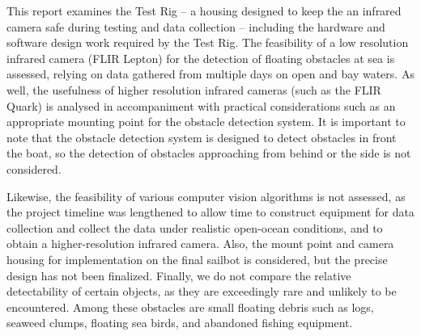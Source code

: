
\iffalse
From the guideline:
This is where the subject of the report can be specified fully; indicate not only what you are examining, but also when and where, as appropriate. As well as knowing what to expect in your report, your reader needs to know what not to expect. Indicate the kinds of problems, places, times, and personnel that are not considered and the impact these omissions and constraints may have on your results. You may also want to explain why these limitations have been necessary.

Notes:
what does the report consider?
-test rig, design and development
-testing IR camera feasibility on two days
-developing a control system for the test rig, allowing for video capture
-the team might be able to get a better camera
-long cables seem to be fine

what didn't we do?
-we don't evaluate which algorithms are best
--we spent a lot of time getting ready to gather data (getting test rigs built and working)
--lots of time on video processing systems to get good contrast
-the lepton cannot see small objects such as logs
-we don't provide a final housing
--sailbot might use our lepton holder, but will need to design a smaller waterproof case for it

impact of omissions:
-we can suggest a lepton holder, but not a final housing
-our work will help the sailbot team test algorithms and gather data, but we can't comment on the best algorithms
\fi

This report examines the Test Rig -- a housing designed to keep the an infrared camera safe during testing and data collection -- including the hardware and software design work required by the Test Rig. The feasibility of a low resolution infrared camera (FLIR Lepton) for the detection of floating obstacles at sea is assessed, relying on data gathered from multiple days on open and bay waters. As well, the usefulness of higher resolution infrared cameras (such as the FLIR Quark) is analysed in accompaniment with practical considerations such as an appropriate mounting point for the obstacle detection system. It is important to note that the obstacle detection system is designed to detect obstacles in front the boat, so the detection of obstacles approaching from behind or the side is not considered.

Likewise, the feasibility of various computer vision algorithms is not assessed, as the project timeline was lengthened to allow time to construct equipment for data collection and collect the data under realistic open-ocean conditions, and to obtain a higher-resolution infrared camera. Also, the mount point and camera housing for implementation on the final sailbot is considered, but the precise design has not been finalized. Finally, we do not compare the relative detectability of certain objects, as they are exceedingly rare and unlikely to be encountered. Among these obstacles are small floating debris such as logs, seaweed clumps, floating sea birds, and abandoned fishing equipment.
